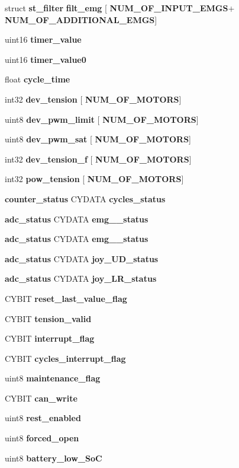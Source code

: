 \begin{DoxyCompactItemize}
struct \textbf{ st\+\_\+filter} \textbf{ filt\+\_\+emg} [\textbf{ N\+U\+M\+\_\+\+O\+F\+\_\+\+I\+N\+P\+U\+T\+\_\+\+E\+M\+GS}+\textbf{ N\+U\+M\+\_\+\+O\+F\+\_\+\+A\+D\+D\+I\+T\+I\+O\+N\+A\+L\+\_\+\+E\+M\+GS}]
\item 
uint16 \textbf{ timer\+\_\+value}
\item 
uint16 \textbf{ timer\+\_\+value0}
\item 
float \textbf{ cycle\+\_\+time}
\item 
int32 \textbf{ dev\+\_\+tension} [\textbf{ N\+U\+M\+\_\+\+O\+F\+\_\+\+M\+O\+T\+O\+RS}]
\item 
uint8 \textbf{ dev\+\_\+pwm\+\_\+limit} [\textbf{ N\+U\+M\+\_\+\+O\+F\+\_\+\+M\+O\+T\+O\+RS}]
\item 
uint8 \textbf{ dev\+\_\+pwm\+\_\+sat} [\textbf{ N\+U\+M\+\_\+\+O\+F\+\_\+\+M\+O\+T\+O\+RS}]
\item 
int32 \textbf{ dev\+\_\+tension\+\_\+f} [\textbf{ N\+U\+M\+\_\+\+O\+F\+\_\+\+M\+O\+T\+O\+RS}]
\item 
int32 \textbf{ pow\+\_\+tension} [\textbf{ N\+U\+M\+\_\+\+O\+F\+\_\+\+M\+O\+T\+O\+RS}]
\item 
\textbf{ counter\+\_\+status} C\+Y\+D\+A\+TA \textbf{ cycles\+\_\+status}
\item 
\textbf{ adc\+\_\+status} C\+Y\+D\+A\+TA \textbf{ emg\+\_\+\_\+status}
\item 
\textbf{ adc\+\_\+status} C\+Y\+D\+A\+TA \textbf{ emg\+\_\+\_\+status}
\item 
\textbf{ adc\+\_\+status} C\+Y\+D\+A\+TA \textbf{ joy\+\_\+\+U\+D\+\_\+status}
\item 
\textbf{ adc\+\_\+status} C\+Y\+D\+A\+TA \textbf{ joy\+\_\+\+L\+R\+\_\+status}
\item 
C\+Y\+B\+IT \textbf{ reset\+\_\+last\+\_\+value\+\_\+flag}
\item 
C\+Y\+B\+IT \textbf{ tension\+\_\+valid}
\item 
C\+Y\+B\+IT \textbf{ interrupt\+\_\+flag}
\item 
C\+Y\+B\+IT \textbf{ cycles\+\_\+interrupt\+\_\+flag}
\item 
uint8 \textbf{ maintenance\+\_\+flag}
\item 
C\+Y\+B\+IT \textbf{ can\+\_\+write}
\item 
uint8 \textbf{ rest\+\_\+enabled}
\item 
uint8 \textbf{ forced\+\_\+open}
\item 
uint8 \textbf{ battery\+\_\+low\+\_\+\+SoC}
\item 

\end{DoxyCompactItemize}
